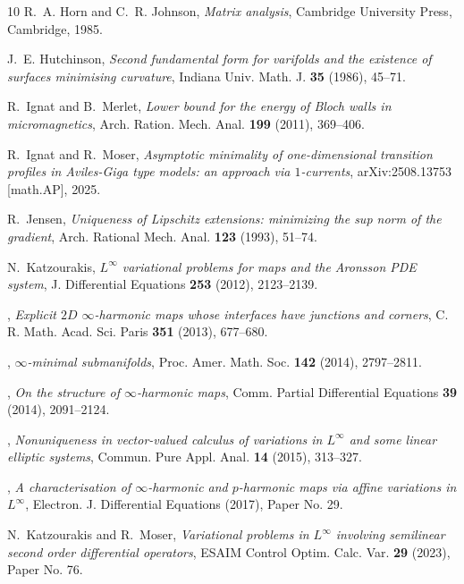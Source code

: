 \documentclass[a4paper]{article}
\theoremstyle{definition}
\theoremstyle{remark}
\begin{document}
\begin{thebibliography}{10}
R.~A. Horn and C.~R. Johnson, \emph{Matrix analysis}, Cambridge University
  Press, Cambridge, 1985.

J.~E. Hutchinson, \emph{Second fundamental form for varifolds and the existence
  of surfaces minimising curvature}, Indiana Univ. Math. J. \textbf{35} (1986),
  45--71.

R.~Ignat and B.~Merlet, \emph{Lower bound for the energy of {B}loch walls in
  micromagnetics}, Arch. Ration. Mech. Anal. \textbf{199} (2011), 369--406.

R.~Ignat and R.~Moser, \emph{Asymptotic minimality of one-dimensional
  transition profiles in {A}viles-{G}iga type models: an approach via
  $1$-currents}, arXiv:2508.13753 [math.AP], 2025.

R.~Jensen, \emph{Uniqueness of {L}ipschitz extensions: minimizing the sup norm
  of the gradient}, Arch. Rational Mech. Anal. \textbf{123} (1993), 51--74.

N.~Katzourakis, \emph{{$L^\infty$} variational problems for maps and the
  {A}ronsson {PDE} system}, J. Differential Equations \textbf{253} (2012),
  2123--2139.

\bysame, \emph{Explicit {$2D$} {$\infty$}-harmonic maps whose interfaces have
  junctions and corners}, C. R. Math. Acad. Sci. Paris \textbf{351} (2013),
  677--680.

\bysame, \emph{{$\infty$}-minimal submanifolds}, Proc. Amer. Math. Soc.
  \textbf{142} (2014), 2797--2811.

\bysame, \emph{On the structure of {$\infty$}-harmonic maps}, Comm. Partial
  Differential Equations \textbf{39} (2014), 2091--2124.

\bysame, \emph{Nonuniqueness in vector-valued calculus of variations in
  {$L^\infty$} and some linear elliptic systems}, Commun. Pure Appl. Anal.
  \textbf{14} (2015), 313--327.

\bysame, \emph{A characterisation of {$\infty$}-harmonic and {$p$}-harmonic
  maps via affine variations in {$L^\infty$}}, Electron. J. Differential
  Equations (2017), Paper No. 29.

N.~Katzourakis and R.~Moser, \emph{Variational problems in {$L^{\infty}$}
  involving semilinear second order differential operators}, ESAIM Control
  Optim. Calc. Var. \textbf{29} (2023), Paper No. 76.


\end{thebibliography}
\end{document}
